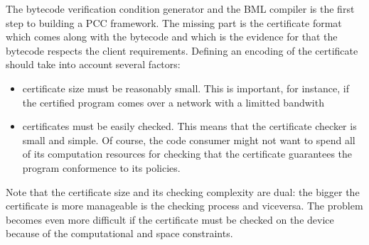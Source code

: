 The bytecode verification condition generator and the BML compiler is the first step to building a PCC framework. 
The missing  part is  the certificate format which comes along with the bytecode and which  is the evidence for 
that the bytecode respects the client requirements. Defining an encoding of the certificate should take into account several factors:
\begin{itemize} 
  \item certificate size must be reasonably small. This is important, for instance,  if the certified program comes over a network with a limitted bandwith
  \item certificates must be easily checked. This means that the certificate checker is  small and simple.
	       Of course, the code consumer might not want to spend all of its computation 
	      resources for checking that the certificate guarantees the program conformence to its policies.     
\end{itemize}

Note that the certificate size and its checking complexity are dual: the bigger the certificate is more manageable is the checking process and viceversa. 
The problem becomes even more difficult if the certificate must be checked on the device because of the computational and space constraints.
 

  
%  
% 
%        
%     


